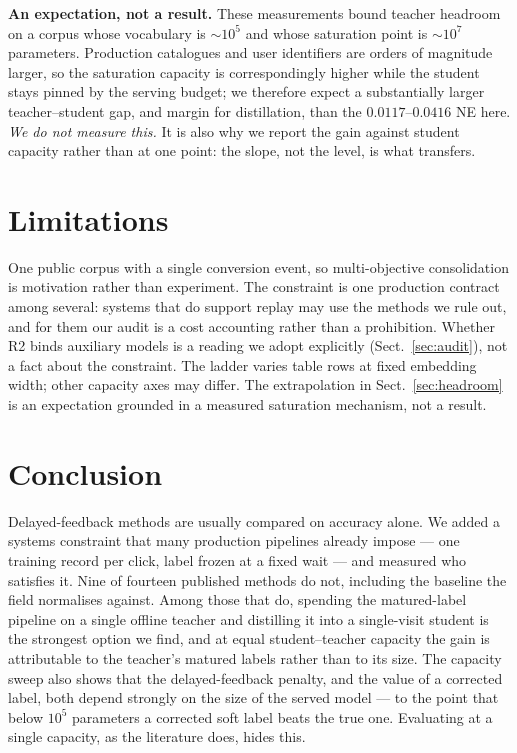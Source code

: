 \documentclass[runningheads]{llncs}
\begin{document}
\smallskip\noindent\textbf{An expectation, not a result.} These measurements bound teacher headroom
on a corpus whose vocabulary is ${\sim}10^{5}$ and whose saturation point is ${\sim}10^{7}$
parameters. Production catalogues and user identifiers are orders of magnitude larger, so the
saturation capacity is correspondingly higher while the student stays pinned by the serving budget;
we therefore expect a substantially larger teacher--student gap, and margin for distillation, than
the $0.0117$--$0.0416$ NE here. \emph{We do not measure this.} It is also why we report the gain
against student capacity rather than at one point: the slope, not the level, is what transfers.

\section{Limitations}\label{sec:limits}

One public corpus with a single conversion event, so multi-objective consolidation is motivation
rather than experiment. The constraint is one production contract among several: systems that do
support replay may use the methods we rule out, and for them our audit is a cost accounting rather
than a prohibition. Whether R2 binds auxiliary models is a reading we adopt explicitly
(Sect.~\ref{sec:audit}), not a fact about the constraint. The ladder varies table rows at fixed
embedding width; other capacity axes may differ. The extrapolation in Sect.~\ref{sec:headroom} is an
expectation grounded in a measured saturation mechanism, not a result.

\section{Conclusion}

Delayed-feedback methods are usually compared on accuracy alone. We added a systems constraint that
many production pipelines already impose --- one training record per click, label frozen at a fixed
wait --- and measured who satisfies it. Nine of fourteen published methods do not, including the
baseline the field normalises against. Among those that do, spending the matured-label pipeline on a
single offline teacher and distilling it into a single-visit student is the strongest option we
find, and at equal student--teacher capacity the gain is attributable to the teacher's matured
labels rather than to its size. The capacity sweep also shows that the delayed-feedback penalty, and
the value of a corrected label, both depend strongly on the size of the served model --- to the
point that below $10^{5}$ parameters a corrected soft label beats the true one. Evaluating at a
single capacity, as the literature does, hides this.



\end{document}
